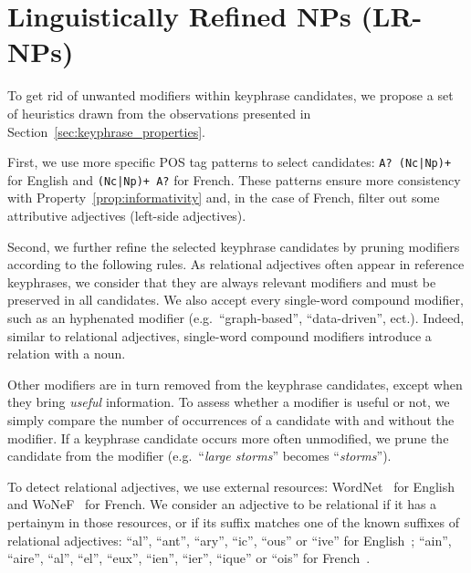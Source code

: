 \section{Linguistically Refined NPs (LR-NPs)}
\label{sec:proposed_candidate_selection_method}
    To get rid of unwanted modifiers within keyphrase candidates, we propose a set of heuristics drawn from the observations presented in Section~\ref{sec:keyphrase_properties}.
    
    First, we use more specific POS tag patterns to select candidates: \texttt{A?\,(Nc|Np)+} for English and \texttt{(Nc|Np)+\,A?} for French.
    These patterns ensure more consistency with Property~\ref{prop:informativity} and, in the case of French, filter out some attributive adjectives (left-side adjectives).
    
    Second, we further refine the selected keyphrase candidates by pruning modifiers according to the following rules.
    As relational adjectives often appear in reference keyphrases, we consider that they are always relevant modifiers and must be preserved in all candidates.
    We also accept every single-word compound modifier, such as an hyphenated modifier (e.g.~``graph-based'', ``data-driven'', ect.).
    Indeed, similar to relational adjectives, single-word compound modifiers introduce a relation with a noun.
    
    Other modifiers are in turn removed from the keyphrase candidates, except when they bring \textit{useful} information.
    To assess whether a modifier is useful or not, we simply compare the number of occurrences of a candidate with and without the modifier.
    If a keyphrase candidate occurs more often unmodified, we prune the candidate from the modifier (e.g.~``\textit{large storms}'' becomes ``\textit{storms}'').
    
    To detect relational adjectives, we use external resources: WordNet~\cite{miller1995wordnet} for English and WoNeF~\cite{pradet2013wonef} for French.
    We consider an adjective to be relational if it has a pertainym in those resources, or if its suffix matches one of the known suffixes of relational adjectives: ``al'', ``ant'', ``ary'', ``ic'', ``ous''  or ``ive'' for English~\cite{grabar2006terminologystructuring}; ``ain'', ``aire'', ``al'', ``el'', ``eux'', ``ien'', ``ier'', ``ique'' or ``ois'' for French~\cite{harastani2013relationaladjectivetranslation}.
